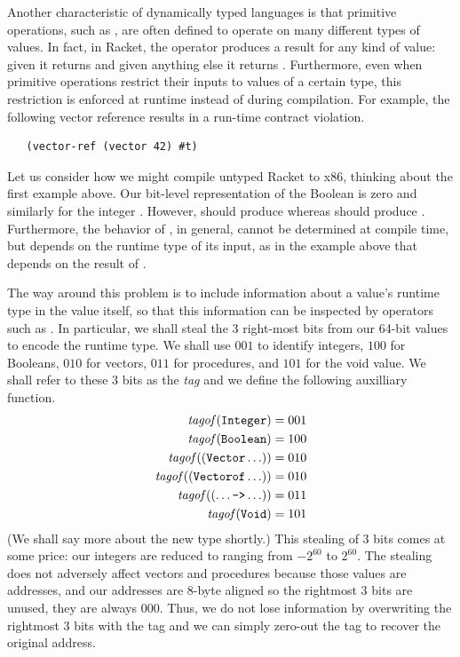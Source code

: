 \documentclass[11pt]{book}
\begin{document}
Another characteristic of dynamically typed languages is that
primitive operations, such as , are often defined to operate
on many different types of values. In fact, in Racket, the 
operator produces a result for any kind of value: given  it
returns  and given anything else it returns .
Furthermore, even when primitive operations restrict their inputs to
values of a certain type, this restriction is enforced at runtime
instead of during compilation. For example, the following vector
reference results in a run-time contract violation.
\begin{lstlisting}
   (vector-ref (vector 42) #t)
\end{lstlisting}

Let us consider how we might compile untyped Racket to x86, thinking
about the first example above. Our bit-level representation of the
Boolean  is zero and similarly for the integer .
However,  should produce  whereas  should produce . Furthermore, the behavior of
, in general, cannot be determined at compile time, but
depends on the runtime type of its input, as in the example above that
depends on the result of .

The way around this problem is to include information about a value's
runtime type in the value itself, so that this information can be
inspected by operators such as .  In particular, we shall
steal the 3 right-most bits from our 64-bit values to encode the
runtime type.  We shall use $001$ to identify integers, $100$ for
Booleans, $010$ for vectors, $011$ for procedures, and $101$ for the
void value. We shall refer to these 3 bits as the \emph{tag} and we
define the following auxilliary function.
\begin{align*}
\mathit{tagof}(\texttt{Integer}) &= 001 \\
\mathit{tagof}(\texttt{Boolean}) &= 100 \\
\mathit{tagof}((\texttt{Vector} \ldots)) &= 010 \\
\mathit{tagof}((\texttt{Vectorof} \ldots)) &= 010 \\
\mathit{tagof}((\ldots \texttt{->} \ldots)) &= 011 \\
\mathit{tagof}(\texttt{Void}) &= 101
\end{align*}
(We shall say more about the new  type shortly.)
This stealing of 3 bits comes at some
price: our integers are reduced to ranging from $-2^{60}$ to
$2^{60}$. The stealing does not adversely affect vectors and
procedures because those values are addresses, and our addresses are
8-byte aligned so the rightmost 3 bits are unused, they are always
$000$. Thus, we do not lose information by overwriting the rightmost 3
bits with the tag and we can simply zero-out the tag to recover the
original address.
\end{document}
